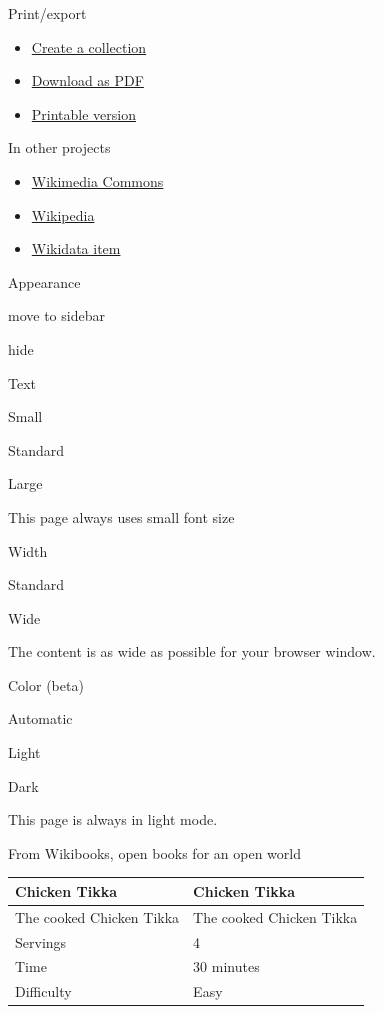 \documentclass[11pt,a4paper]{article}
\begin{document}
Print/export

\begin{itemize}
\item \href{https://en.wikibooks.org/w/index.php?title=Special:Book\&bookcmd=book\_creator\&referer=Cookbook\%3AChicken+Tikka}{Create a collection}
\item \href{https://en.wikibooks.org/w/index.php?title=Special:DownloadAsPdf\&page=Cookbook\%3AChicken\_Tikka\&action=show-download-screen}{Download as PDF}
\item \href{https://en.wikibooks.org/w/index.php?title=Cookbook:Chicken\_Tikka\&printable=yes}{Printable version}
\end{itemize}

In other projects

\begin{itemize}
\item \href{https://commons.wikimedia.org/wiki/Category:Chicken\_tikka}{Wikimedia Commons}
\item \href{https://en.wikipedia.org/wiki/Chicken\_tikka}{Wikipedia}
\item \href{https://www.wikidata.org/wiki/Special:EntityPage/Q2548408}{Wikidata item}
\end{itemize}

Appearance

move to sidebar

hide

Text

Small

Standard

Large

This page always uses small font size

Width

Standard

Wide

The content is as wide as possible for your browser window.

Color (beta)

Automatic

Light

Dark

This page is always in light mode.

From Wikibooks, open books for an open world

\begin{table}[h]
\begin{tabular}{|l|l|}
\hline
Chicken Tikka & Chicken Tikka \\ \hline
The cooked Chicken Tikka & %
The cooked Chicken Tikka \\ \hline
Servings & 4 \\ \hline
Time & 30 minutes \\ \hline
Difficulty & %
Easy \\ \hline
\end{tabular}
\end{table}
\end{document}
